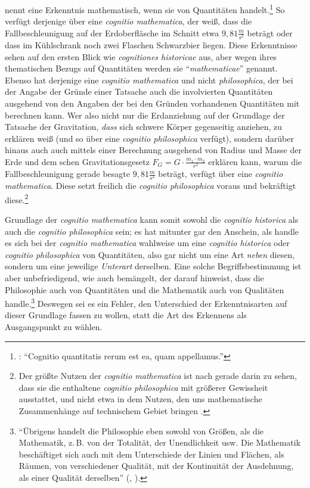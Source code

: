  nennt eine Erkenntnis
mathematisch, wenn sie von Quantitäten handelt.\footnote{\cite[Vg.][\S~14]{Wolff:Discursuspraeliminarisdephilosophiaingenere1996}:
\enquote{Cognitio quantitatis rerum est ea, quam 
appellamus.}} So verfügt derjenige über eine \emph{cognitio mathematica}, der
weiß, dass die Fallbeschleunigung auf der Erdoberfläsche im Schnitt etwa $9,81
\frac{m}{s^2}$ beträgt oder dass im Kühlschrank noch zwei Flaschen Schwarzbier
liegen. Diese Erkenntnisse sehen auf den ersten Blick wie \emph{cognitiones
historicae} aus, aber wegen ihres thematischen Bezugs auf Quantitäten werden sie
\enquote{\emph{mathematicae}} genannt. Ebenso hat derjenige eine \emph{cognitio
mathematica} und nicht \emph{philosophica}, der bei der Angabe der Gründe einer
Tatsache auch die involvierten Quantitäten ausgehend von den Angaben der bei den
Gründen vorhandenen Quantitäten mit berechnen kann. Wer also
nicht nur die Erdanziehung auf der Grundlage der Tatsache der Gravitation,
\emph{dass} sich schwere Körper gegenseitig anziehen, zu erklären weiß (und so
über eine \emph{cognitio philosophica} verfügt), sondern darüber hinaus auch
auch mittels einer Berechnung ausgehend von Radius und Masse der Erde und dem
schen Gravitationsgesetz $ F_G = G \cdot \frac{m_1 \cdot
m_2}{r^2} $ erklären kann, warum die Fallbeschleunigung gerade besagte $9,81
\frac{m}{s^2}$ beträgt, verfügt über eine \emph{cognitio mathematica}. Diese
setzt freilich die \emph{cognitio philosophica} voraus und bekräftigt
diese.\footnote{Der größte Nutzen der \emph{cognitio mathematica} ist nach
 gerade darin zu sehen, dass sie die
enthaltene \emph{cognitio philosophica} mit größerer Gewissheit ausstattet, und
nicht etwa in dem Nutzen, den uns mathematische Zusammenhänge auf technischem
Gebiet bringen \parencite[vgl.][\S~27]{Wolff:Discursuspraeliminarisdephilosophiaingenere1996}.}


Grundlage der \emph{cognitio mathematica} kann somit sowohl die \emph{cognitio
historica} als auch die \emph{cognitio philosophica} sein; es hat mitunter gar
den Anschein, als handle es sich bei der \emph{cognitio mathematica} wahlweise
um eine \emph{cognitio historica} oder \emph{cognitio philosophica} von
Quantitäten, also gar nicht um eine Art \emph{neben} diesen, sondern um eine
jeweilige \emph{Unterart} derselben. Eine solche Begriffsbestimmung ist aber
unbefriedigend, wie auch  bemängelt, der darauf hinweist,
dass die Philosophie auch von Quantitäten und die Mathematik auch von Qualitäten
handle.\footnote{\enquote{Übrigens handelt die
Philosophie eben sowohl von Größen, als die Mathematik, z.\,B. von der Totalität, der Unendlichkeit usw.
Die Mathematik beschäftiget sich auch mit dem Unterschiede der Linien und
Flächen, als Räumen, von verschiedener Qualität, mit der Kontinuität der
Ausdehnung, als einer Qualität derselben} \mkbibparens{\cite[][B
743]{Kant:KritikderreinenVernunft2003}, \cite[][III:
470.15--20]{Kant:GesammelteWerke1900ff.}}.} Deswegen sei es ein Fehler, den
Unterschied der Erkenntnisarten auf dieser Grundlage fassen zu wollen, statt die
Art des Erkennens als Ausgangspunkt zu wählen.



